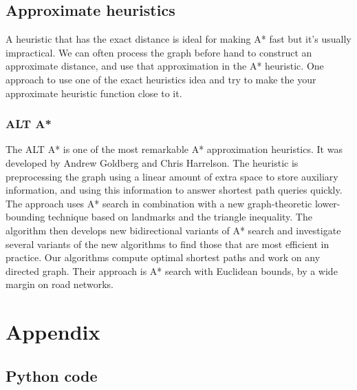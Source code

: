 \documentclass[12pt]{article}
\begin{document}
\newpage
\subsection{Approximate heuristics}
A heuristic that has the exact distance is ideal for making A* fast but it’s usually impractical. We can often process the graph before hand to construct an approximate distance, and use that approximation in the A* heuristic. One approach to use one of the exact heuristics idea and try to make the your approximate heuristic function close to it.

\subsubsection{ALT A*}
The ALT A* is one of the most remarkable A* approximation heuristics. It was developed by Andrew Goldberg and Chris Harrelson. The heuristic is preprocessing the graph using a linear amount of extra space to store auxiliary information, and using this information to answer shortest path queries quickly. The approach uses A* search in combination with a new graph-theoretic lower-bounding technique based on landmarks and the triangle inequality. The algorithm then develops new bidirectional variants of A* search and investigate several variants of the new algorithms to find those that are most efficient in practice. Our algorithms compute optimal shortest paths and work on any directed graph. Their approach is A* search with Euclidean bounds, by a wide margin on road networks.

\printbibliography

\section{Appendix}
\subsection{Python code}
\label{sec:pythonCode}

\end{document}
